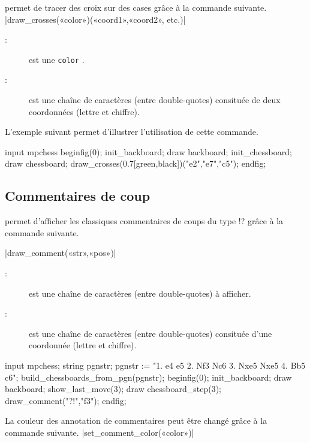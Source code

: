\documentclass[french]{ltxdoc}
\begin{document}
\mpchess permet de tracer des croix sur des cases  grâce à la commande
suivante.
\commande|draw_crosses(«color»)(«coord1»,«coord2», etc.)|\smallskip

\begin{description}
  \item[:] est une \lstinline+color+ \MP.
  \item[:] est une chaîne de caractères (entre double-quotes) consituée de deux coordonnées (lettre et chiffre).
  \end{description}

L’exemple suivant permet d’illustrer l’utilisation de cette commande.

\begin{ExempleMP}
input mpchess
beginfig(0);
init_backboard;
draw backboard;
init_chessboard;
draw chessboard;
draw_crosses(0.7[green,black])("e2","e7","c5");
endfig;
\end{ExempleMP}

\subsection{Commentaires de coup}

\mpchess permet d’afficher les classiques commentaires de coups du type
\og{}!?\fg{} grâce à la commande suivante.

\commande|draw_comment(«str»,«pos»)|\smallskip

\begin{description}
\item[:] est une chaîne de caractères (entre double-quotes) à
afficher. 
\item[:] est une chaîne de caractères (entre double-quotes) consituée
d’une coordonnée (lettre et chiffre). 
\end{description}

\begin{ExempleMP}
input mpchess;
string pgnstr;
pgnstr := "1. e4 e5 2. Nf3 Nc6 3. Nxe5 Nxe5 4. Bb5 c6";
build_chessboards_from_pgn(pgnstr);
beginfig(0);
init_backboard;
draw backboard;
show_last_move(3);
draw chessboard_step(3); %
draw_comment("?!","f3");
endfig;
\end{ExempleMP}




La couleur des annotation de commentaires peut être changé grâce à la commande
suivante.
\commande|set_comment_color(«color»)|\smallskip
\end{document}
